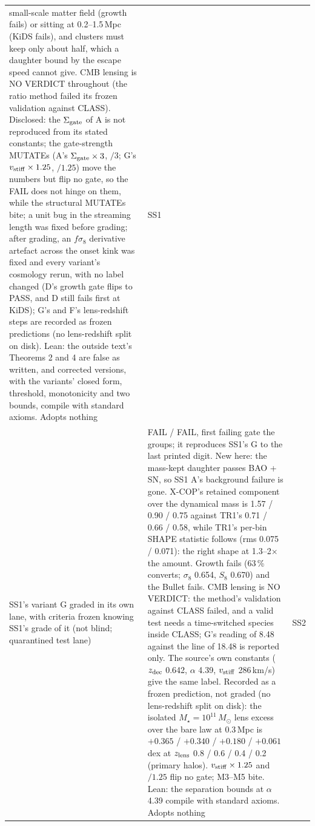 \documentclass[10pt]{article}
\begin{document}
\begin{longtable}{@{}p{4.4cm}p{8.6cm}p{2.8cm}@{}}
small-scale matter field (growth fails) or sitting at 0.2--1.5\,Mpc (KiDS fails), and clusters must keep only about half, which a daughter bound by the escape speed cannot give. CMB lensing is NO VERDICT throughout (the ratio method failed its frozen validation against CLASS). Disclosed: the $\Sigma_{\rm gate}$ of A is not reproduced from its stated constants; the gate-strength MUTATEs (A's $\Sigma_{\rm gate}\times3$, $/3$; G's $v_{\rm stiff}\times1.25$, $/1.25$) move the numbers but flip no gate, so the FAIL does not hinge on them, while the structural MUTATEs bite; a unit bug in the streaming length was fixed before grading; after grading, an $f\sigma_8$ derivative artefact across the onset kink was fixed and every variant's cosmology rerun, with no label changed (D's growth gate flips to PASS, and D still fails first at KiDS); G's and F's lens-redshift steps are recorded as frozen predictions (no lens-redshift split on disk). Lean: the outside text's Theorems 2 and 4 are false as written, and corrected versions, with the variants' closed form, threshold, monotonicity and two bounds, compile with standard axioms. Adopts nothing & SS1\\
SS1's variant G graded in its own lane, with criteria frozen knowing SS1's grade of it (not blind; quarantined test lane) & FAIL / FAIL, first failing gate the groups; it reproduces SS1's G to the last printed digit. New here: the mass-kept daughter passes BAO + SN, so SS1 A's background failure is gone. X-COP's retained component over the dynamical mass is 1.57 / 0.90 / 0.75 against TR1's 0.71 / 0.66 / 0.58, while TR1's per-bin SHAPE statistic follows (rms 0.075 / 0.071): the right shape at 1.3--2$\times$ the amount. Growth fails (63\,\% converts; $\sigma_8$ 0.654, $S_8$ 0.670) and the Bullet fails. CMB lensing is NO VERDICT: the method's validation against CLASS failed, and a valid test needs a time-switched species inside CLASS; G's reading of 8.48 against the line of 18.48 is reported only. The source's own constants ($z_{\rm dec}$ 0.642, $\alpha$ 4.39, $v_{\rm stiff}$ 286\,km/s) give the same label. Recorded as a frozen prediction, not graded (no lens-redshift split on disk): the isolated $M_\star=10^{11}\,M_\odot$ lens excess over the bare law at 0.3\,Mpc is $+0.365$ / $+0.340$ / $+0.180$ / $+0.061$\,dex at $z_{\rm lens}$ 0.8 / 0.6 / 0.4 / 0.2 (primary halos). $v_{\rm stiff}\times1.25$ and $/1.25$ flip no gate; M3--M5 bite. Lean: the separation bounds at $\alpha$ 4.39 compile with standard axioms. Adopts nothing & SS2\\

\end{longtable}
\end{document}
